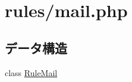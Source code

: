 \hypertarget{mail_8php}{
\section{rules/mail.php}
\label{mail_8php}
}
\subsection*{データ構造}
\begin{DoxyCompactItemize}
\item 
class \hyperlink{class_rule_mail}{\-Rule\-Mail}
\end{DoxyCompactItemize}
